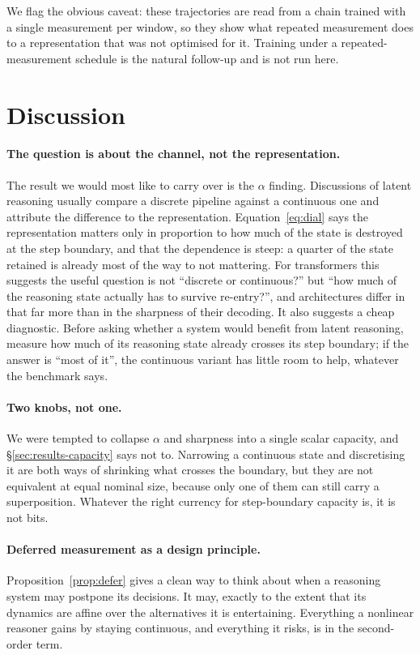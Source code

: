 \documentclass[11pt]{article}
\theoremstyle{definition}
\begin{document}
We flag the obvious caveat: these trajectories are read from a chain trained with a
single measurement per window, so they show what repeated measurement does to a
representation that was not optimised for it. Training under a repeated-measurement
schedule is the natural follow-up and is not run here.

\section{Discussion}

\paragraph{The question is about the channel, not the representation.} The result we
would most like to carry over is the $\alpha$ finding. Discussions of latent reasoning
usually compare a discrete pipeline against a continuous one and attribute the
difference to the representation. Equation~\eqref{eq:dial} says the representation
matters only in proportion to how much of the state is destroyed at the step boundary,
and that the dependence is steep: a quarter of the state retained is already most of
the way to not mattering. For transformers this suggests the useful question is not
``discrete or continuous?'' but ``how much of the reasoning state actually has to
survive re-entry?'', and architectures differ in that far more than in the sharpness
of their decoding. It also suggests a cheap diagnostic. Before asking whether a system
would benefit from latent reasoning, measure how much of its reasoning state already
crosses its step boundary; if the answer is ``most of it'', the continuous variant has
little room to help, whatever the benchmark says.

\paragraph{Two knobs, not one.} We were tempted to collapse $\alpha$ and sharpness
into a single scalar capacity, and \S\ref{sec:results-capacity} says not to. Narrowing
a continuous state and discretising it are both ways of shrinking what crosses the
boundary, but they are not equivalent at equal nominal size, because only one of them
can still carry a superposition. Whatever the right currency for step-boundary
capacity is, it is not bits.

\paragraph{Deferred measurement as a design principle.} Proposition~\ref{prop:defer}
gives a clean way to think about when a reasoning system may postpone its decisions.
It may, exactly to the extent that its dynamics are affine over the alternatives it is
entertaining. Everything a nonlinear reasoner gains by staying continuous, and
everything it risks, is in the second-order term.
\end{document}
